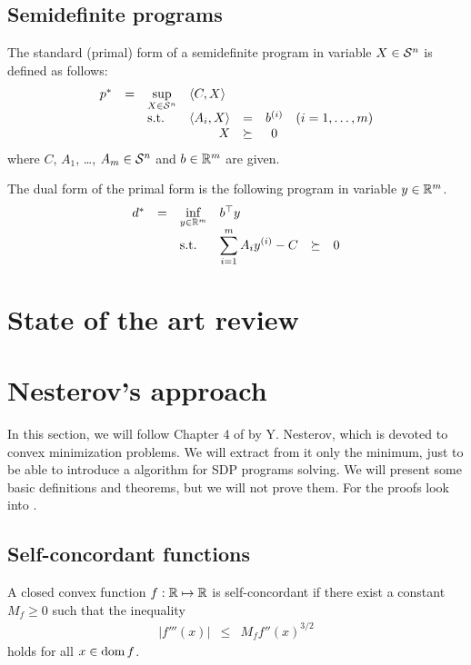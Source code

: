 \subsection{Semidefinite programs}
The standard (primal) form of a semidefinite program in variable $X\in\mathcal{S}^n$ is defined as follows:
\begin{eqnarray}
  \begin{array}{rclrrclcll}
    p^* &=& \displaystyle \sup_{X\in\Sym^n} & \multicolumn{3}{l}{\langle C,X\rangle} \\
    && \text{s.t.} & \langle A_i, X\rangle &=& b\ind i & (i = 1,\ldots,m)\\
    &&& X &\succeq& 0
  \end{array}
\end{eqnarray}
where $C$, $A_1$, \ldots, $A_m \in \mathcal{S}^n$ and $b\in\mathbb{R}^m$ are given.

The dual form of the primal form is the following program in variable $y\in\mathbb{R}^m$.
\begin{eqnarray}
  \begin{array}{rclrrclcll}
    d^* &=& \displaystyle \inf_{y\in\R^m} & \multicolumn{3}{l}{b^\top y} \\
    && \text{s.t.} & \displaystyle \sum_{i=1}^m A_iy\ind i - C &\succeq& 0
  \end{array}\labeleq{SDP:prelim:dual}
\end{eqnarray}

\section{State of the art review}


\section{Nesterov's approach}
In this section, we will follow Chapter 4 of \cite{Nesterov-2004} by Y. Nesterov, which is devoted to convex minimization problems.
We will extract from it only the minimum, just to be able to introduce a algorithm for SDP programs solving.
We will present some basic definitions and theorems, but we will not prove them.
For the proofs look into \cite{Nesterov-2004}.

\subsection{Self-concordant functions}
\begin{definition}
  A closed convex function $f: \mathbb{R} \mapsto \mathbb{R}$ is self-concordant if there exist a constant $M_f \geq 0$ such that the inequality
  \begin{eqnarray}
    |f'''(x)| &\leq& M_f f''(x)^{3/2}
  \end{eqnarray}
  holds for all $x\in\operatorname{dom} f$.
\end{definition}

